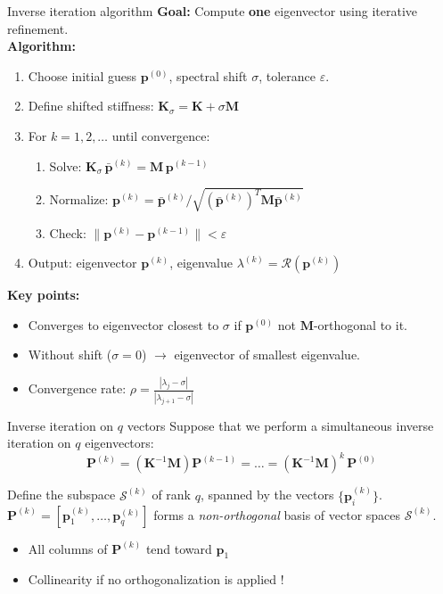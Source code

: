 \documentclass[aspectratio=169]{beamer}
\begin{document}
{\begin{frame}{Inverse iteration algorithm}
  \small
  \textbf{Goal:} Compute \textbf{one} eigenvector using iterative refinement. \\[2mm]

  \textbf{Algorithm:}
  \begin{enumerate}
    \item Choose initial guess \(\mathbf p^{(0)}\), spectral shift \(\sigma\), tolerance \(\varepsilon\).
    \item Define shifted stiffness: \(\mathbf K_\sigma = \mathbf K + \sigma \mathbf M\)
    \item For \(k = 1,2,\dots\) until convergence:
          \begin{enumerate}
            \item Solve: \(\mathbf K_\sigma \, \bar{\mathbf p}^{(k)} = \mathbf M \, \mathbf p^{(k-1)}\)
            \item Normalize: \(\mathbf p^{(k)} = \bar{\mathbf p}^{(k)} / \sqrt{(\bar{\mathbf p}^{(k)})^T \mathbf M \bar{\mathbf p}^{(k)}}\)
            \item Check: \(\|\mathbf p^{(k)} - \mathbf p^{(k-1)}\| < \varepsilon\)
          \end{enumerate}
    \item Output: eigenvector \(\mathbf p^{(k)}\), eigenvalue \(\lambda^{(k)} = \mathcal R(\mathbf p^{(k)})\)
  \end{enumerate}

  \vspace{2mm}
  \textbf{Key points:}
  \begin{itemize}
    \item Converges to eigenvector closest to \(\sigma\) if \(\mathbf p^{(0)}\) not \(\mathbf M\)-orthogonal to it.
    \item Without shift (\(\sigma=0\)) $\to$ eigenvector of smallest eigenvalue.
    \item Convergence rate: \(\rho = \frac{|\lambda_j - \sigma|}{|\lambda_{j+1}-\sigma|}\)
  \end{itemize}
\end{frame}

\begin{frame}{Inverse iteration on \( q \) vectors}
  Suppose that we perform a simultaneous inverse iteration on \( q \) eigenvectors:
  \[
    \mathbf P^{(k)} = (\mathbf K^{-1}\mathbf M)\mathbf P^{(k-1)}=\dots = (\mathbf K^{-1}\mathbf M)^k\, \mathbf P^{(0)}
  \]
  \vspace{-0.5cm}
  \begin{block}{}
    Define the subspace \( \mathcal S^{(k)} \) of rank \( q \), spanned by the vectors \( \{\mathbf p_i^{(k)}\} \).  $\mathbf  P^{(k)}=[\mathbf p^{(k)}_1,\dots,\mathbf p^{(k)}_q]$ forms a \emph{non-orthogonal} basis of vector spaces \( \mathcal S^{(k)} \).
  \end{block}
  \begin{itemize}
    \item[\XSolidBrush] All columns of \(\mathbf  P^{(k)} \) tend toward \( \mathbf  p_1 \)
    \item[\XSolidBrush]  Collinearity if no orthogonalization is applied !
  \end{itemize}


\end{frame}}
\end{document}
